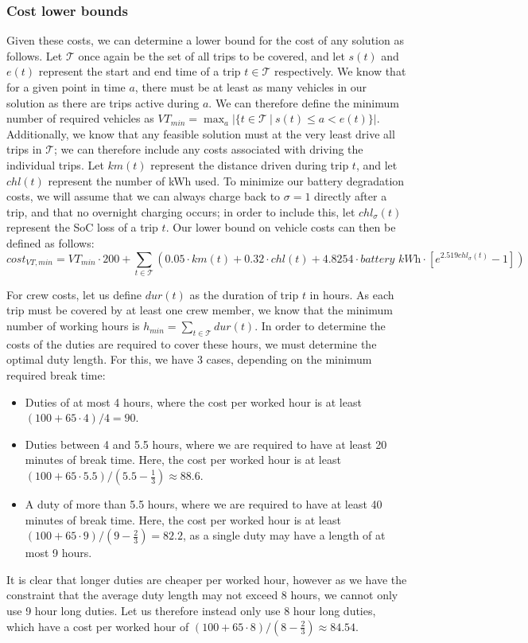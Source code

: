 \documentclass[]{article}
\begin{document}
\subsubsection{Cost lower bounds}
Given these costs, we can determine a lower bound for the cost of any solution as follows. Let $\mathcal{T}$ once again be the set of all trips to be covered, and let $s(t)$ and $e(t)$ represent the start and end time of a trip $t \in \mathcal{T}$ respectively. We know that for a given point in time $a$, there must be at least as many vehicles in our solution as there are trips active during $a$. We can therefore define the minimum number of required vehicles as $VT_{min} = \max_{a} |\{ t \in \mathcal{T} \:|\: s(t) \leq a < e(t) \}|$. Additionally, we know that any feasible solution must at the very least drive all trips in $\mathcal{T}$; we can therefore include any costs associated with driving the individual trips. Let $km(t)$ represent the distance driven during trip $t$, and let $chl(t)$ represent the number of kWh used. To minimize our battery degradation costs, we will assume that we can always charge back to $\sigma=1$ directly after a trip, and that no overnight charging occurs; in order to include this, let $chl_\sigma(t)$ represent the SoC loss of a trip $t$. Our lower bound on vehicle costs can then be defined as follows: 
\begin{equation}
  cost_{VT,min} = VT_{min} \cdot 200 + \sum_{t \in \mathcal{T}} (0.05 \cdot km(t) + 0.32 \cdot chl(t) +  4.8254 \cdot \textit{battery kWh} \cdot [e^{2.519chl_\sigma(t)} - 1]) \nonumber
\end{equation}

\noindent For crew costs, let us define $dur(t)$ as the duration of trip $t$ in hours. As each trip must be covered by at least one crew member, we know that the minimum number of working hours is $h_{min} = \sum_{t \in \mathcal{T}} dur(t)$. In order to determine the costs of the duties are required to cover these hours, we must determine the optimal duty length. For this, we have 3 cases, depending on the minimum required break time: 
\begin{itemize}
  \item Duties of at most 4 hours, where the cost per worked hour is at least $(100 + 65 \cdot 4) / 4 = 90$.
  \item Duties between 4 and 5.5 hours, where we are required to have at least 20 minutes of break time. Here, the cost per worked hour is at least $(100 + 65 \cdot 5.5) / (5.5 - \frac{1}{3}) \approx 88.6$.
  \item A duty of more than 5.5 hours, where we are required to have at least 40 minutes of break time. Here, the cost per worked hour is at least $(100 + 65 \cdot 9) / (9 - \frac{2}{3}) = 82.2$, as a single duty may have a length of at most 9 hours.
\end{itemize}
It is clear that longer duties are cheaper per worked hour, however as we have the constraint that the average duty length may not exceed 8 hours, we cannot only use 9 hour long duties. Let us therefore instead only use 8 hour long duties, which have a cost per worked hour of $(100 + 65 \cdot 8) / (8 - \frac{2}{3}) \approx 84.54$. 
\end{document}
